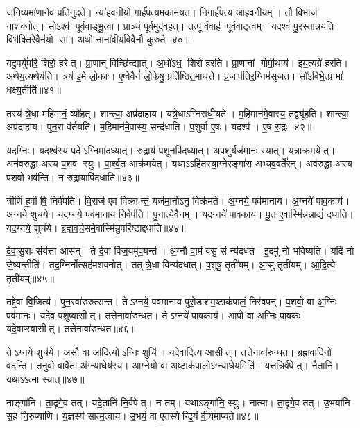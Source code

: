 ज॒नि॒ष्यमा॑णाने॒व प्रति॑नुदते।
न्या॑हव॒नीयो॒ गार्\mbox{}ह॑पत्य\-मकामयत।
निगार्\mbox{}ह॑पत्य आहव॒नीयम्।
तौ वि॒भाजं॒ नाश॑क्नोत्।
सोऽश्व॑ पूर्व॒वाड्भू॒त्वा।
प्राञ्चं॒ पूर्व॒मुद॑वहत्।
तत्पूर्व॒वाह॑ पूर्ववा॒ट्त्वम्।
यदश्वं॑ पु॒रस्ता॒न्नय॑ति।
विभ॑क्तिरे॒वैन॑यो॒ सा।
अथो॒ नाना॑वीर्यावे॒वैनौ॑ कुरुते॥४०॥

यदु॒पर्यु॑परि॒ शिरो॒ हरेत्।
प्रा॒णान्‌ विच्छि॑न्द्यात्।
अ॒धो॑ऽध॒ शिरो॑ हरति।
प्रा॒णानां गोपी॒थाय॑।
इय॒त्यग्रे॑ हरति।
अथेय॒त्यथेय॑ति।
त्रय॑ इ॒मे लो॒काः।
ए॒ष्वे॑वैनं॑ लो॒केषु॒ प्रति॑ष्ठित॒माध॑त्ते।
प्र॒जाप॑तिर॒ग्निम॑सृजत।
सो॑ऽबिभे॒त्प्र मा॑ धक्ष्य॒तीति॑॥४१॥

तस्य॑ त्रे॒धा म॑हि॒मानं॒ व्यौ॑हत्।
शान्त्या॒ अप्र॑दाहाय।
यत्रे॒धाऽग्निरा॑धी॒यते।
म॒हि॒मान॑मे॒वास्य॒ तद्व्यू॑हति।
शान्त्या॒ अप्र॑दाहाय।
पुन॒रा व॑र्तयति।
म॒हि॒मान॑मे॒वास्य॒ सन्द॑धाति।
प॒शुर्वा ए॒षः।
यदश्व॑।
ए॒ष रु॒द्रः॥४२॥

यद॒ग्निः।
यदश्व॑स्य प॒देऽग्निमा॑द॒ध्यात्।
रु॒द्राय॑ प॒शूनपि॑दध्यात्।
अ॒प॒शुर्यज॑मानः स्यात्।
यन्नाक्र॒मयेत्।
अन॑वरुद्धा अस्य प॒शव॑ स्युः।
पा॒र्श्व॒त आक्र॑मयेत्।
यथाऽऽहि॑तस्या॒ग्नेरङ्गा॑रा अभ्यव॒वर्ते॑रन्।
अव॑रुद्धा अस्य प॒शवो॒ भव॑न्ति।
न रु॒द्रायापि॑दधाति॥४३॥

त्रीणि॑ ह॒वीषि॒ निर्व॑पति।
वि॒राज॑ ए॒व विक्रान्तं॒ यज॑मा॒नोऽनु॒ विक्र॑मते।
अ॒ग्नये॒ पव॑मानाय।
अ॒ग्नये॑ पाव॒काय॑।
अ॒ग्नये॒ शुच॑ये।
यद॒ग्नये॒ पव॑मानाय नि॒र्वप॑ति।
पु॒नात्ये॒वैनम्।
यद॒ग्नये॑ पाव॒काय॑।
पू॒त ए॒वास्मि॑न्न॒न्नाद्यं॑ दधाति।
यद॒ग्नये॒ शुच॑ये।
ब्र॒ह्म॒व॒र्च॒समे॒वास्मि॑न्नु॒परि॑ष्टाद्दधाति॥४४॥\anuvakamend[ए॒न॒मा॒ह॒व॒नीयं॑ धत्तेऽश्व॒त्वं व॑र्तयति कुरुत॒ इति॑ रु॒द्रो द॑धाति॒ य॒दग्नये॒ शुच॑य॒ एकं॑ च]

दे॒वा॒सु॒राः संय॑त्ता आसन्।
ते दे॒वा वि॑ज॒यमु॑प॒यन्त॑।
अ॒ग्नौ वा॒मं वसु॒ सं न्य॑दधत।
इ॒दमु॑ नो भविष्यति।
यदि॑ नो जे॒ष्यन्तीति॑।
तद॒ग्निर्नोत्सह॑मशक्नोत्।
तत् त्रे॒धा विन्य॑दधात्।
प॒शुषु॒ तृती॑यम्।
अ॒प्सु तृती॑यम्।
आ॒दि॒त्ये तृती॑यम्॥४५॥

तद्दे॒वा वि॒जित्य॑।
पुन॒रवा॑रुरुत्सन्त।
तेऽग्नये॒ पव॑मानाय पुरो॒डाश॑म॒ष्टाक॑पालं॒ निर॑वपन्।
प॒शवो॒ वा अ॒ग्निः पव॑मानः।
यदे॒व प॒शुष्वासीत्।
तत्तेनावा॑रुन्धत।
तेऽग्नये॑ पाव॒काय॑।
आपो॒ वा अ॒ग्निः पा॑व॒कः।
यदे॒वाप्स्वासीत्।
तत्तेनावा॑रुन्धत॥४६॥

तेऽग्नये॒ शुच॑ये।
अ॒सौ वा आ॑दि॒त्योऽग्निः शुचि॑।
यदे॒वादि॒त्य आसीत्।
तत्तेनावा॑रुन्धत।
ब्र॒ह्म॒वा॒दिनो॑ वदन्ति।
त॒नुवो॒ वावैता अ॑ग्न्या॒धेय॑स्य।
आ॒ग्ने॒यो वा अ॒ष्टाक॑पालोऽग्न्या॒धेय॒मिति॑।
यत्तन्नि॒र्वपेत्।
नैतानि॑।
यथा॒ऽऽत्मा स्यात्॥४७॥

नाङ्गा॑नि।
ता॒दृगे॒व तत्।
यदे॒तानि॑ नि॒र्वपेत्।
न तम्।
यथाऽङ्गा॑नि॒ स्युः।
नात्मा।
ता॒दृगे॒व तत्।
उ॒भया॑नि स॒ह नि॒रुप्या॑णि।
य॒ज्ञस्य॑ सात्म॒त्वाय॑।
उ॒भयं॒ वा ए॒तस्येन्द्रि॒यं वी॒र्य॑माप्यते॥४८॥

